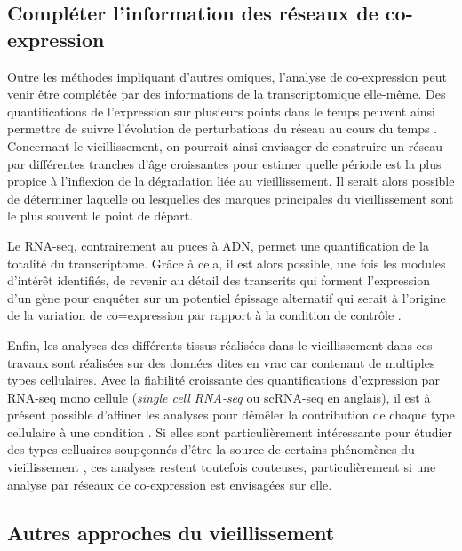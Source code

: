 \subsection{Compléter l'information des réseaux de co-expression}

Outre les méthodes impliquant d'autres omiques, l'analyse de co-expression peut venir être complétée par des informations de la transcriptomique elle-même. Des quantifications de l'expression sur plusieurs points dans le temps peuvent ainsi permettre de suivre l'évolution de perturbations du réseau au cours du temps \cite{Liu2013Dec}. Concernant le vieillissement, on pourrait ainsi envisager de construire un réseau par différentes tranches d'âge croissantes pour estimer quelle période est la plus propice à l'inflexion de la dégradation liée au vieillissement. Il serait alors possible de déterminer laquelle ou lesquelles des marques principales du vieillissement sont le plus souvent le point de départ.

Le RNA-seq, contrairement au puces à ADN, permet une quantification de la totalité du transcriptome. Grâce à cela, il est alors possible, une fois les modules d'intérêt identifiés, de revenir au détail des transcrits qui forment l'expression d'un gène pour enquêter sur un potentiel épissage alternatif qui serait à l'origine de la variation de co=expression par rapport à la condition de contrôle \cite{Saha2017Oct,Sun2021Jun}.

Enfin, les analyses des différents tissus réalisées dans le vieillissement dans ces travaux sont réalisées sur des données dites en vrac car contenant de multiples types cellulaires. Avec la fiabilité croissante des quantifications d'expression par RNA-seq mono cellule (\textit{single cell RNA-seq} ou scRNA-seq en anglais), il est à présent possible d'affiner les analyses pour démêler la contribution de chaque type cellulaire à une condition \cite{Chowdhury2019}. Si elles sont particulièrement intéressante pour étudier des types celluaires soupçonnés d'être la source de certains phénomènes du vieillissement \cite{Uyar2020,FonsecaCosta2020Dec,Menon2019Oct}, ces analyses restent toutefois couteuses, particulièrement si une analyse par réseaux de co-expression est envisagées sur elle.



\subsection{Autres approches du vieillissement}

